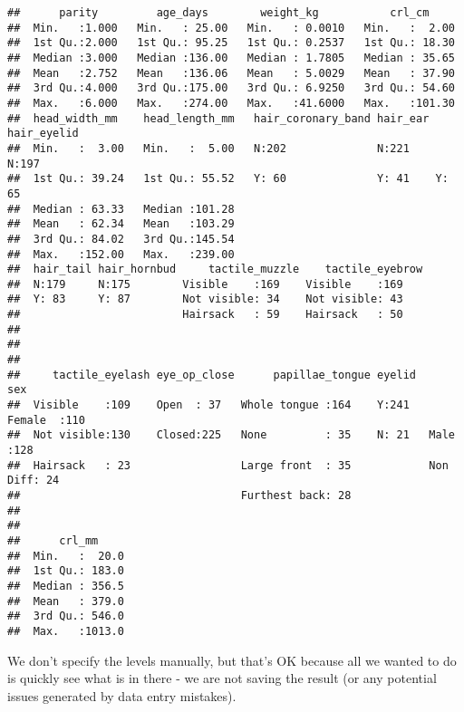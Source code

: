 \documentclass[
]{article}
\begin{document}
\begin{verbatim}
##      parity         age_days        weight_kg           crl_cm      
##  Min.   :1.000   Min.   : 25.00   Min.   : 0.0010   Min.   :  2.00  
##  1st Qu.:2.000   1st Qu.: 95.25   1st Qu.: 0.2537   1st Qu.: 18.30  
##  Median :3.000   Median :136.00   Median : 1.7805   Median : 35.65  
##  Mean   :2.752   Mean   :136.06   Mean   : 5.0029   Mean   : 37.90  
##  3rd Qu.:4.000   3rd Qu.:175.00   3rd Qu.: 6.9250   3rd Qu.: 54.60  
##  Max.   :6.000   Max.   :274.00   Max.   :41.6000   Max.   :101.30  
##  head_width_mm    head_length_mm   hair_coronary_band hair_ear hair_eyelid
##  Min.   :  3.00   Min.   :  5.00   N:202              N:221    N:197      
##  1st Qu.: 39.24   1st Qu.: 55.52   Y: 60              Y: 41    Y: 65      
##  Median : 63.33   Median :101.28                                          
##  Mean   : 62.34   Mean   :103.29                                          
##  3rd Qu.: 84.02   3rd Qu.:145.54                                          
##  Max.   :152.00   Max.   :239.00                                          
##  hair_tail hair_hornbud     tactile_muzzle    tactile_eyebrow
##  N:179     N:175        Visible    :169    Visible    :169   
##  Y: 83     Y: 87        Not visible: 34    Not visible: 43   
##                         Hairsack   : 59    Hairsack   : 50   
##                                                              
##                                                              
##                                                              
##     tactile_eyelash eye_op_close      papillae_tongue eyelid        sex     
##  Visible    :109    Open  : 37   Whole tongue :164    Y:241   Female  :110  
##  Not visible:130    Closed:225   None         : 35    N: 21   Male    :128  
##  Hairsack   : 23                 Large front  : 35            Non Diff: 24  
##                                  Furthest back: 28                          
##                                                                             
##                                                                             
##      crl_mm      
##  Min.   :  20.0  
##  1st Qu.: 183.0  
##  Median : 356.5  
##  Mean   : 379.0  
##  3rd Qu.: 546.0  
##  Max.   :1013.0
\end{verbatim}

We don't specify the levels manually, but that's OK because all we
wanted to do is quickly see what is in there - we are not saving the
result (or any potential issues generated by data entry mistakes).
\end{document}
